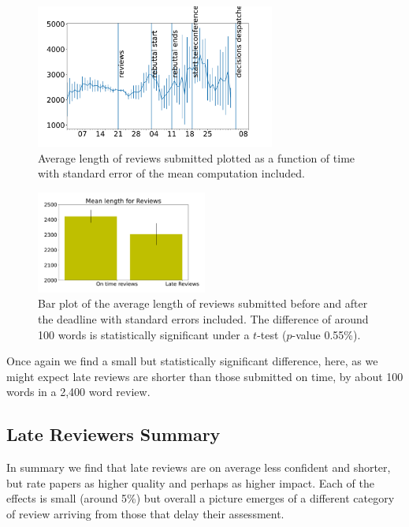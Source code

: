 \begin{figure}[htb]
\centering
\includegraphics[width=0.70\textwidth]{diagrams/neurips/review-length-time.pdf}


\caption{Average length of reviews submitted plotted as a function of time with standard error of the mean computation included.}
\label{review-length-time}
\end{figure}

\begin{figure}[htb]
\centering
\includegraphics[width=0.50\textwidth]{diagrams/neurips/review-length-early-late.pdf}

\caption{Bar plot of the average length of reviews
submitted before and after the deadline with standard errors included.
The difference of around 100 words is statistically significant under a
\(t\)-test (\(p\)-value 0.55\%).} \label{review-length-early-late}
\end{figure}

Once again we find a small but statistically significant difference,
here, as we might expect late reviews are shorter than those submitted
on time, by about 100 words in a 2,400 word review.


\subsection{Late Reviewers Summary}\label{late-reviewers-summary}

In summary we find that late reviews are on average less confident and
shorter, but rate papers as higher quality and perhaps as higher impact.
Each of the effects is small (around 5\%) but overall a picture emerges
of a different category of review arriving from those that delay their
assessment.

